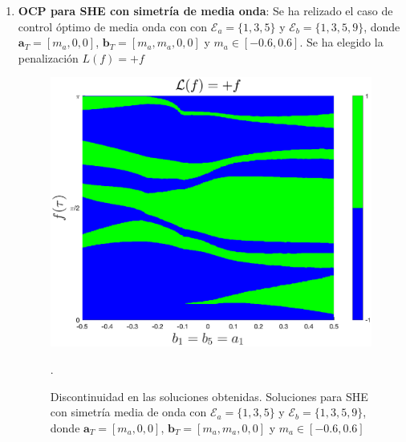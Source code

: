 \begin{enumerate}
    
    \item \textbf{OCP para SHE con simetría de media onda}: Se ha relizado el caso de control óptimo de media onda con con $\mathcal{E}_a = \{1,3,5\}$ y  $\mathcal{E}_b = \{1,3,5,9\}$, donde $\bm{a}_T = [m_a,0,0]$, $\bm{b}_T = [m_a,m_a,0,0]$ y  $m_a \in [-0.6,0.6]$. Se ha elegido la penalización $L(f) = +f$
    \begin{figure}
        \centering
        \includegraphics[scale=0.45]{img/alphabeta.eps}
        \caption{Discontinuidad en las soluciones obtenidas. Soluciones para SHE con simetría media de onda con $\mathcal{E}_a = \{1,3,5\}$ y  $\mathcal{E}_b = \{1,3,5,9\}$, donde $\bm{a}_T = [m_a,0,0]$, $\bm{b}_T = [m_a,m_a,0,0]$ y  $m_a \in [-0.6,0.6]$}. 

    \end{figure}






\end{enumerate}
